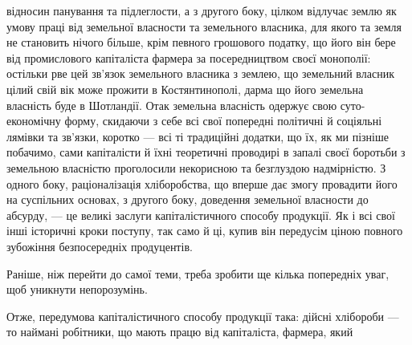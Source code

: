 відносин панування та підлеглости, а з другого боку, цілком відлучає землю
як умову праці від земельної власности та земельного власника, для якого та
земля не становить нічого більше, крім певного грошового податку, що його
він бере від промислового капіталіста фармера за посередництвом своєї монополії:
остільки рве цей зв’язок земельного власника з землею, що земельний власник
цілий свій вік може прожити в Костянтинополі, дарма що його земельна власність
буде в Шотландії. Отак земельна власність одержує свою суто-економічну
форму, скидаючи з себе всі свої попередні політичні й соціяльні лямівки та
зв’язки, коротко — всі ті традиційні додатки, що їх, як ми пізніше побачимо, сами
капіталісти й їхні теоретичні проводирі в запалі своєї боротьби з земельною
власністю проголосили некорисною та безглуздою надмірністю. З одного боку,
раціоналізація хліборобства, що вперше дає змогу провадити його на суспільних
основах, з другого боку, доведення земельної власности до абсурду, — це великі
заслуги капіталістичного способу продукції. Як і всі свої інші історичні кроки
поступу, так само й ці, купив він передусім ціною повного зубожіння безпосередніх
продуцентів.

Раніше, ніж перейти до самої теми, треба зробити ще кілька попередніх
уваг, щоб уникнути непорозумінь.

Отже, передумова капіталістичного способу продукції така: дійсні хлібороби
— то наймані робітники, що мають працю від капіталіста, фармера, який
\parbreak{}  %
